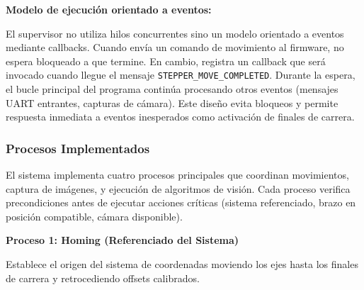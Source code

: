 \textbf{Modelo de ejecución orientado a eventos:}

El supervisor no utiliza hilos concurrentes sino un modelo orientado a eventos mediante callbacks. Cuando envía un comando de movimiento al firmware, no espera bloqueado a que termine. En cambio, registra un callback que será invocado cuando llegue el mensaje \texttt{STEPPER\_MOVE\_COMPLETED}. Durante la espera, el bucle principal del programa continúa procesando otros eventos (mensajes UART entrantes, capturas de cámara). Este diseño evita bloqueos y permite respuesta inmediata a eventos inesperados como activación de finales de carrera.

\subsubsection{Procesos Implementados}

El sistema implementa cuatro procesos principales que coordinan movimientos, captura de imágenes, y ejecución de algoritmos de visión. Cada proceso verifica precondiciones antes de ejecutar acciones críticas (sistema referenciado, brazo en posición compatible, cámara disponible).

\textbf{Proceso 1: Homing (Referenciado del Sistema)}

Establece el origen del sistema de coordenadas moviendo los ejes hasta los finales de carrera y retrocediendo offsets calibrados.

